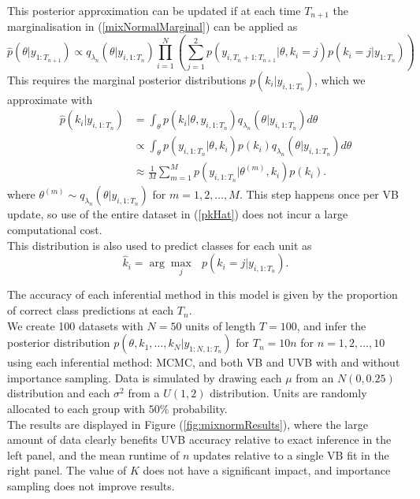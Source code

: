 \documentclass[12pt,a4paper]{article}\usepackage[]{graphicx}\usepackage[]{color}
\begin{document}
This posterior approximation can be updated if at each time $T_{n+1}$ the marginalisation in (\ref{mixNormalMarginal}) can be applied as
\begin{equation}
\label{mixNormalUpdate}
\hat{p}(\theta | y_{1:T_{n+1}}) \propto q_{\lambda_{n}}(\theta | y_{i, 1:T_{n}}) \prod_{i=1}^N \left( \sum_{j=1}^2 p(y_{i, T_n+1:T_{n+1}} | \theta, k_i = j) p(k_i = j | y_{1:T_n}) \right)
\end{equation}
This requires the marginal posterior distributions $p(k_i | y_{i, 1:T_{n}})$, which we approximate with
\begin{align}
\hat{p}(k_i | y_{i, 1:T_{n}}) &= \int_{\theta} p(k_i | \theta, y_{i, 1:T_{n}})q_{\lambda_{n}}(\theta | y_{i, 1:T_{n}}) d\theta \nonumber \\
&\propto \int_{\theta} p(y_{i, 1:T_n} | \theta, k_i) p(k_i) q_{\lambda_{n}}(\theta | y_{i, 1:T_{n}}) d\theta \nonumber \\
&\approx \frac{1}{M} \sum_{m=1}^M p(y_{i, 1:T_n} | \theta^{(m)} , k_i) p(k_i). \label{pkHat}
\end{align}
where $\theta^{(m)} \sim q_{\lambda_{n}}(\theta | y_{i, 1:T_{n}})$ for $m = 1, 2, \dots, M$. This step happens once per VB update, so use of the entire dataset in (\ref{pkHat}) does not incur a large computational cost.
\\

This distribution is also used to predict classes for each unit as
\begin{equation}
\hat{k}_i = \arg \underset{j}{\max}\mbox{ } p(k_i = j | y_{i, 1:T_n}).
\end{equation}

The accuracy of each inferential method in this model is given by the proportion of correct class predictions at each $T_n$.
\\

We create 100 datasets with $N = 50$ units of length $T = 100$, and infer the posterior distribution $p(\theta, k_1, \dots, k_N | y_{1:N, 1:T_n})$ for $T_n = 10n$ for $n = 1, 2, \dots, 10$ using each inferential method: MCMC, and both VB and UVB with and without importance sampling. Data is simulated by drawing each $\mu$ from an $N(0, 0.25)$ distribution and each $\sigma^2$ from a $U(1, 2)$ distribution. Units are randomly allocated to each group with $50\%$ probability. 
\\

The results are displayed in Figure (\ref{fig:mixnormResults}), where the large amount of data clearly benefits UVB accuracy relative to exact inference in the left panel, and the mean runtime of $n$ updates relative to a single VB fit in the right panel. The value of $K$ does not have a significant impact, and importance sampling does not improve results.
\end{document}
